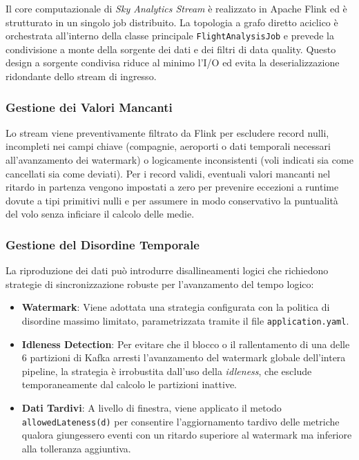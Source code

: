 \documentclass[conference]{IEEEtran}
\begin{document}
Il core computazionale di \textit{Sky Analytics Stream} è realizzato in Apache Flink ed è strutturato in un singolo job distribuito. La topologia a grafo diretto aciclico è orchestrata all'interno della classe principale \texttt{FlightAnalysisJob} e prevede la condivisione a monte della sorgente dei dati e dei filtri di data quality. Questo design a sorgente condivisa riduce al minimo l'I/O ed evita la deserializzazione ridondante dello stream di ingresso.

\subsubsection{Gestione dei Valori Mancanti}\label{subsubsec:flink_data_quality}
Lo stream viene preventivamente filtrato da Flink per escludere record nulli, incompleti nei campi chiave (compagnie, aeroporti o dati temporali necessari all'avanzamento dei watermark) o logicamente inconsistenti (voli indicati sia come cancellati sia come deviati). Per i record validi, eventuali valori mancanti nel ritardo in partenza vengono impostati a zero per prevenire eccezioni a runtime dovute a tipi primitivi nulli e per assumere in modo conservativo la puntualità del volo senza inficiare il calcolo delle medie.

\subsubsection{Gestione del Disordine Temporale}\label{subsubsec:flink_watermarking}
La riproduzione dei dati può introdurre disallineamenti logici che richiedono strategie di sincronizzazione robuste per l'avanzamento del tempo logico:
\begin{itemize}
    \item \textbf{Watermark}: Viene adottata una strategia configurata con la politica di disordine massimo limitato, parametrizzata tramite il file \texttt{application.yaml}.
    \item \textbf{Idleness Detection}: Per evitare che il blocco o il rallentamento di una delle 6 partizioni di Kafka arresti l'avanzamento del watermark globale dell'intera pipeline, la strategia è irrobustita dall'uso della \textit{idleness}, che esclude temporaneamente dal calcolo le partizioni inattive.
    \item \textbf{Dati Tardivi}: A livello di finestra, viene applicato il metodo \texttt{allowedLateness(d)} per consentire l'aggiornamento tardivo delle metriche qualora giungessero eventi con un ritardo superiore al watermark ma inferiore alla tolleranza aggiuntiva.
\end{itemize}
\end{document}
